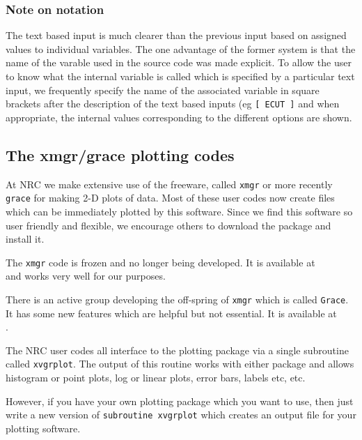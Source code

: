 \documentclass[12pt,twoside]{article}  %
\begin{document}
\subsubsection{Note on notation}
The text based input is much clearer than the previous input based on
assigned values to individual variables. The one advantage of the former
system is that the name of the varable used in the source code was made
explicit.  To allow the user to know what the internal variable is called
which is specified by a particular text input, we frequently specify the
name of the associated variable in square brackets after the description of
the text based inputs (eg {\tt [ ECUT ]} and when appropriate, the
internal values corresponding to the different options are shown.

\subsection{The xmgr/grace plotting codes}

At NRC we make extensive use of the freeware, called {\tt xmgr} or more
recently {\tt grace} for making 2-D plots of data.  Most of these user
codes now create files which can be immediately plotted by this software.
Since we find this software so user friendly and flexible, we encourage
others to download the package and install it.

The {\tt xmgr} code is frozen and no longer being developed. It is
available at\\ 
and works very well for our purposes.

There is an active group developing the off-spring of {\tt xmgr} which is
called {\tt Grace}. It has some new features which are helpful but not
essential. It is available at\\ .

The NRC user codes all interface to the plotting package via a single
subroutine called {\tt xvgrplot}. The output of this routine works with either
package and allows histogram or point plots, log or linear plots, error
bars, labels etc, etc.

However, if you have your own plotting package which you want to use, then
just write a new version of {\tt subroutine xvgrplot} which creates an
output file for your plotting software.
\end{document}
